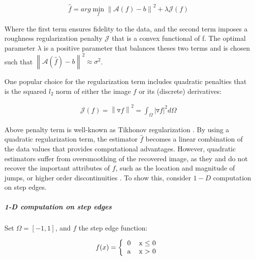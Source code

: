 \begin{equation}
\label{eq:nonweightedregularization}
\begin{gathered}
\widehat{f} = arg\min_{f}\left\|\mathcal{A}(f)-b\right\|^{2} + \lambda\mathcal{J}(f)
\end{gathered}
\end{equation}


Where the first term ensures fidelity to the data, and the second term imposes a roughness regularization penalty $\mathcal{J}$ that is a convex functional of f.
The optimal parameter $\lambda$ is a positive parameter that balances theses two terms and is chosen such that $\left\|\mathcal{A}(\hat{f})-b\right\|^{2} \approx \sigma^{2}$.

One popular choice for the regularization term includes quadratic penalties \cite{tikhonov1943stability} that is the squared $l_{2}$ norm of either the image $f$ or its (discrete) derivatives:

\begin{equation}
\begin{gathered}
\mathcal{J}(f) = \left\|\triangledown f\right\|^{2} = \int_{\Omega} |\triangledown f|^2 d\Omega
\end{gathered}
\end{equation}

Above penalty term is well-known as Tikhonov regularization \cite{tikhonov1977solutions}. By using a quadratic regularization term, the estimator $\widehat{f}$ becomes a linear combination of the data values that provides computational advantages. However, quadratic estimators suffer from oversmoothing of the recovered image, as they and do not recover the important attributes of $f$, such as the location and magnitude of jumps, or higher order discontinuities \cite{geman95}. To show this, consider $1-D$ computation on step edges.

\subparagraph{1-D computation on step edges} %
Set $\Omega = [-1,1]$, and $f$ the step edge function:

\begin{equation}
\begin{gathered}
f(x) = 
\left \{
  \begin{tabular}{cc}
  0 & x $\leq$ 0 \\
  a & x $>$ 0
  \end{tabular}
\right.
\end{gathered}
\end{equation}

